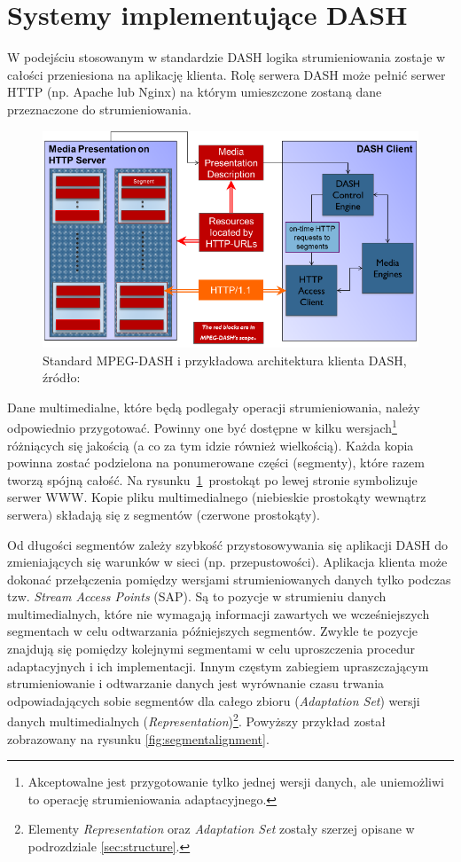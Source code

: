 \section{Systemy implementujące DASH}
W podejściu stosowanym w standardzie DASH logika strumieniowania zostaje w całości przeniesiona na aplikację klienta. Rolę serwera DASH może pełnić serwer HTTP (np. Apache lub Nginx) na którym umieszczone zostaną dane przeznaczone do strumieniowania.
\label{sec:dash-arch}

\begin{figure}[h!]
	\centering
		\includegraphics{dash}
	\caption{Standard MPEG-DASH i przykładowa architektura klienta DASH, źródło:~\cite{DASH}}
	\label{fig:dash}
\end{figure}

Dane multimedialne, które będą podlegały operacji strumieniowania, należy odpowiednio przygotować. Powinny one być dostępne w kilku wersjach\footnote{Akceptowalne jest przygotowanie tylko jednej wersji danych, ale uniemożliwi to operację strumieniowania adaptacyjnego.} różniących się jakością (a co za tym idzie również wielkością). Każda kopia powinna zostać podzielona na ponumerowane części (segmenty), które razem tworzą spójną całość. Na rysunku~\ref{fig:dash}~prostokąt po lewej stronie symbolizuje serwer WWW. Kopie pliku multimedialnego (niebieskie prostokąty wewnątrz serwera) składają się z segmentów (czerwone prostokąty). 

Od długości segmentów zależy szybkość przystosowywania się aplikacji DASH do zmieniających się warunków w sieci (np. przepustowości). Aplikacja klienta może dokonać przełączenia pomiędzy wersjami strumieniowanych danych tylko podczas tzw. \textit{Stream Access Points} (SAP). Są to pozycje w strumieniu danych multimedialnych, które nie wymagają informacji zawartych we wcześniejszych segmentach w celu odtwarzania późniejszych segmentów. Zwykle te pozycje znajdują się pomiędzy kolejnymi segmentami w celu uproszczenia procedur adaptacyjnych i ich implementacji. Innym częstym zabiegiem upraszczającym strumieniowanie i odtwarzanie danych jest wyrównanie czasu trwania odpowiadających sobie segmentów dla całego zbioru (\textit{Adaptation Set}) wersji danych multimedialnych (\textit{Representation})\footnote{Elementy \textit{Representation} oraz \textit{Adaptation Set} zostały szerzej opisane w podrozdziale \ref{sec:structure}.}. Powyższy przykład został zobrazowany na rysunku \ref{fig:segmentalignment}.

